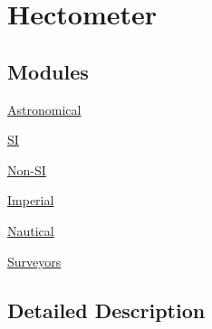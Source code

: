 \hypertarget{group___e_g_x_math-_conversions-_length_conversions-_s_i-_hectometer}{}\section{Hectometer}
\label{group___e_g_x_math-_conversions-_length_conversions-_s_i-_hectometer}
\subsection*{Modules}
\begin{DoxyCompactItemize}
\item 
\mbox{\hyperlink{group___e_g_x_math-_conversions-_length_conversions-_s_i-_hectometer-_astronomical}{Astronomical}}
\item 
\mbox{\hyperlink{group___e_g_x_math-_conversions-_length_conversions-_s_i-_hectometer-_s_i}{SI}}
\item 
\mbox{\hyperlink{group___e_g_x_math-_conversions-_length_conversions-_s_i-_hectometer-_non-_s_i}{Non-\/\+SI}}
\item 
\mbox{\hyperlink{group___e_g_x_math-_conversions-_length_conversions-_s_i-_hectometer-_imperial}{Imperial}}
\item 
\mbox{\hyperlink{group___e_g_x_math-_conversions-_length_conversions-_s_i-_hectometer-_nautical}{Nautical}}
\item 
\mbox{\hyperlink{group___e_g_x_math-_conversions-_length_conversions-_s_i-_hectometer-_surveyors}{Surveyors}}
\end{DoxyCompactItemize}


\subsection{Detailed Description}
